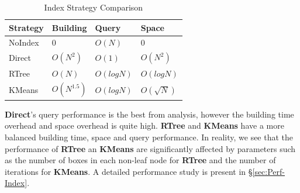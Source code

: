 \documentclass{sig-alternate}
\begin{document}
\begin{table}[t]
\begin{center}
    \caption{Index Strategy Comparison}
    \begin{scriptsize}
    \begin{tabular}{ | p{1.75cm} | p{1.75cm} | p{1.75cm} | p{1.75cm} |}
    \hline
    Strategy & Building & Query & Space \\ \hline \hline
    NoIndex & 0 & $O(N)$ & 0 \\ \hline
    Direct & $O(N^2)$ & $O(1)$ & $O(N^2)$ \\ \hline
    RTree & $O(N)$ & $O(logN)$ & $O(logN)$ \\ \hline
    KMeans & $O(N^{1.5})$ & $O(logN)$ & $O(\sqrt{N})$ \\ \hline
    \end{tabular}
    \end{scriptsize}
    \label{tb:index-comparison}
\end{center}   
\end{table}

{\bf Direct}'s query performance is the best from analysis, however the building time overhead and space overhead is quite high.
{\bf RTree} and {\bf KMeans} have a more balanced building time, space and query performance.
In reality, we see that the performance of {\bf RTree} an {\bf KMeans} are significantly affected by parameters such as the
number of boxes in each non-leaf node for {\bf RTree} and the number of iterations for {\bf KMeans}.
A detailed performance study is present in \S\ref{sec:Perf-Index}.

\end{document}

